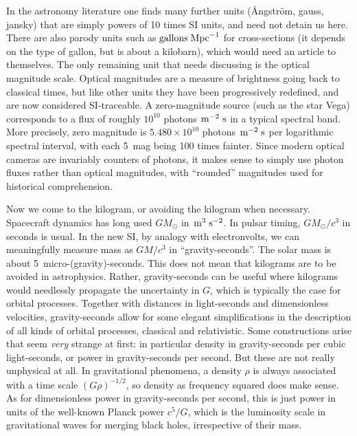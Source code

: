 \documentclass[aps,prb,12pt]{revtex4-1}
\def\unit#1{\;{\rm#1}}
\begin{document}
In the astronomy literature one finds many further units (\AA ngström,
gauss, jansky) that are simply powers of 10 times SI units, and need
not detain us here.  There are also parody units such as
$\!\!\unit{gallons}\unit{Mpc}^{-1}$ for cross-sections (it depends on
the type of gallon, but is about a kilobarn), which would need an
article to themselves.  The only remaining unit that needs discussing
is the optical magnitude scale.  Optical magnitudes are a measure of
brightness going back to classical times, but like other units they
have been progressively redefined, and are now considered
SI-traceable.  A zero-magnitude source (such as the star Vega)
corresponds to a flux of roughly $10^{10}$ photons
$\!\unit{m}^{-2}\unit{s}$ in a typical spectral band.  More precisely,
zero magnitude is $5.480 \times10^{10}$ photons
$\!\unit{m}^{-2}\unit{s}$ per logarithmic spectral interval, with each
5~mag being 100 times fainter.  Since modern optical cameras are
invariably counters of photons, it makes sense to simply use photon
fluxes rather than optical magnitudes, with ``rounded'' magnitudes
used for historical comprehension.

Now we come to the kilogram, or avoiding the kilogram when necessary.
Spacecraft dynamics has long used $GM_\odot$ in
$\!\unit{m}^3\unit{s}^{-2}$.  In pulsar timing, $GM_\odot/c^3$ in
seconds is usual.  In the new SI, by analogy with electronvolts, we
can meaningfully measure mass as $GM/c^3$ in ``gravity-seconds''.  The
solar mass is about 5~micro-(gravity)-seconds.  This does not mean
that kilograms are to be avoided in astrophysics.  Rather,
gravity-seconds can be useful where kilograms would needlessly
propagate the uncertainty in $G$, which is typically the case for
orbital processes.  Together with distances in light-seconds and
dimensionless velocities, gravity-seconds allow for some elegant
simplifications in the description of all kinds of orbital processes,
classical and relativistic.\cite{2020PASP..132b1001S} Some
constructions arise that seem {\em very} strange at first: in
particular density in gravity-seconds per cubic light-seconds, or
power in gravity-seconds per second.  But these are not really
unphysical at all.  In gravitational phenomena, a density $\rho$ is
always associated with a time scale $(G\rho)^{-1/2}$, so density as
frequency squared does make sense.  As for dimensionless power in
gravity-seconds per second, this is just power in units of the
well-known Planck power $c^5/G$, which is the luminosity scale in
gravitational waves for merging black holes, irrespective of their
mass.
\end{document}
